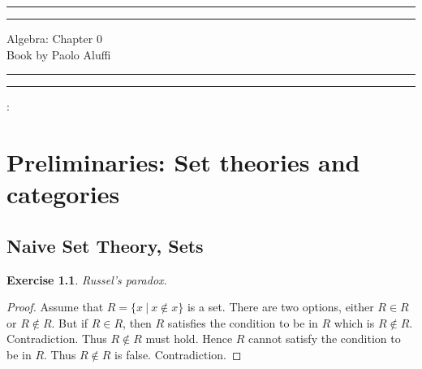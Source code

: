 \documentclass[a4paper, 11pt]{book}
\theoremstyle{plain}
\newtheorem{exercise}[theorem]{Exercise}
\theoremstyle{plain}
\begin{document}
  \begin{titlepage}
	\centering %
	\scshape %
	\vspace*{1.5\baselineskip} %

	\rule{13cm}{1.6pt}\vspace*{-\baselineskip}\vspace*{2pt} %
	\rule{13cm}{0.4pt} %
	
		\vspace{0.75\baselineskip} %
	{	\Huge Algebra: Chapter 0\\ 
			\vspace{4mm}
		Book by Paolo Aluffi \\	}
		\vspace{0.75\baselineskip} %
	\rule{13cm}{0.4pt}\vspace*{-\baselineskip}\vspace{3.2pt} %
	\rule{13cm}{1.6pt} %
	
		\vspace{1.75\baselineskip} %
	{\large : 
		\vspace*{1.2\baselineskip}
	} \\
	\vfill

\end{titlepage}
\begingroup
\let\cleardoublepage\clearpage
\tableofcontents
\endgroup


\chapter{Preliminaries: Set theories and categories}
  \section{Naive Set Theory, Sets}
  \begin{exercise}
  Russel's paradox.
  \end{exercise}
  \begin{proof}
  Assume that $R = \{x~\vert~x\notin x\}$ is a set. There are two options, either $R\in R$ or $R\notin R$. But if $R\in R$, then $R$ satisfies the condition to be in $R$ which is $R\notin R$. Contradiction. Thus $R\notin R$ must hold. Hence $R$ cannot satisfy the condition to be in $R$. Thus $R\notin R$ is false. Contradiction.
\end{proof}
  
\end{document}
